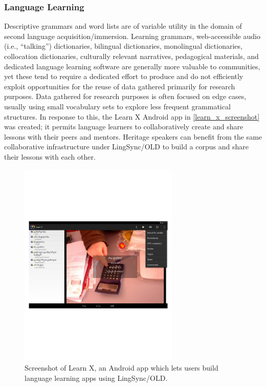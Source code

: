 \documentclass[11pt]{article}
\begin{document}
\subsubsection{Language Learning}

Descriptive grammars and word lists are of variable utility in the domain of second language acquisition/immersion.
Learning grammars, web-accessible audio (i.e., ``talking'') dictionaries, bilingual dictionaries, monolingual dictionaries, collocation dictionaries, culturally relevant narratives, pedagogical materials, and dedicated language
learning software are generally more valuable to communities, yet these tend to
require a dedicated effort to produce and do not efficiently exploit
opportunities for the reuse of data gathered primarily for research purposes. 
Data gathered for research purposes is often focused on edge cases, usually
using small vocabulary sets to explore less frequent grammatical structures.
In response to this, the Learn X Android app in \autoref{learn_x_screenshot}
was created; it permits language learners to collaboratively create and share
lessons with their peers and mentors. Heritage speakers can benefit from the
same collaborative infrastructure under LingSync/OLD to build a corpus and share
their lessons with each other. 

\begin{figure}
\begin{center}
\includegraphics[width=3in]{images/learnX}
\caption{Screenshot of Learn X, an Android app which lets users build language
learning apps using LingSync/OLD.}
\label{learn_x_screenshot}
\end{center}
\end{figure}
\end{document}
